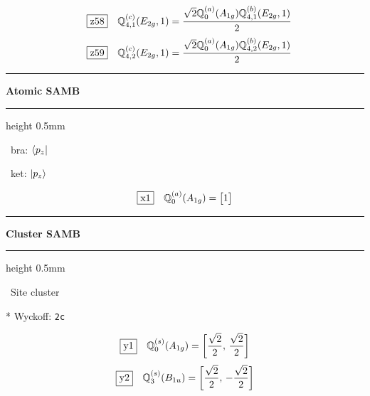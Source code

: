 \documentclass[fleqn,10pt,landscape]{jsarticle}
\begin{document}
\begin{dmath*}
\hspace*{3mm}\fbox{z58}\quad \mathbb{Q}_{4,1}^{(c)}(E_{2g},1)=\frac{\sqrt{2} \mathbb{Q}_{0}^{(a)}(A_{1g}) \mathbb{Q}_{4,1}^{(b)}(E_{2g},1)}{2}
\end{dmath*}
\begin{dmath*}
\hspace*{3mm}\fbox{z59}\quad \mathbb{Q}_{4,2}^{(c)}(E_{2g},1)=\frac{\sqrt{2} \mathbb{Q}_{0}^{(a)}(A_{1g}) \mathbb{Q}_{4,2}^{(b)}(E_{2g},1)}{2}
\end{dmath*}
\vspace{5mm}

\vspace{5mm}
\noindent \rule[0.5mm]{5mm}{0.5mm}\hspace{3mm}\textbf{Atomic SAMB}\hspace{3mm}\leaders\hrule height 0.5mm\hfill\kern0pt
\vspace{3mm}

\vspace{5mm}

\noindent\textbullet\, bra: $\bra{p_{z}}$

\noindent\textbullet\, ket: $\ket{p_{z}}$

\begin{dmath*}
\fbox{x1}\quad \mathbb{Q}_{0}^{(a)}(A_{1g})=\begin{bmatrix} 1 \end{bmatrix}
\end{dmath*}
\vspace{5mm}
\noindent \rule[0.5mm]{5mm}{0.5mm}\hspace{3mm}\textbf{Cluster SAMB}\hspace{3mm}\leaders\hrule height 0.5mm\hfill\kern0pt
\vspace{3mm}

\noindent\textbullet\, Site cluster

\vspace{5mm}

\noindent ** Wyckoff: \texttt{2c}

\begin{dmath*}
\fbox{y1}\quad \mathbb{Q}_{0}^{(s)}(A_{1g})=\left[ \frac{\sqrt{2}}{2},\, \frac{\sqrt{2}}{2} \right]
\end{dmath*}
\begin{dmath*}
\fbox{y2}\quad \mathbb{Q}_{3}^{(s)}(B_{1u})=\left[ \frac{\sqrt{2}}{2},\, - \frac{\sqrt{2}}{2} \right]
\end{dmath*}
\vspace{5mm}
\end{document}
